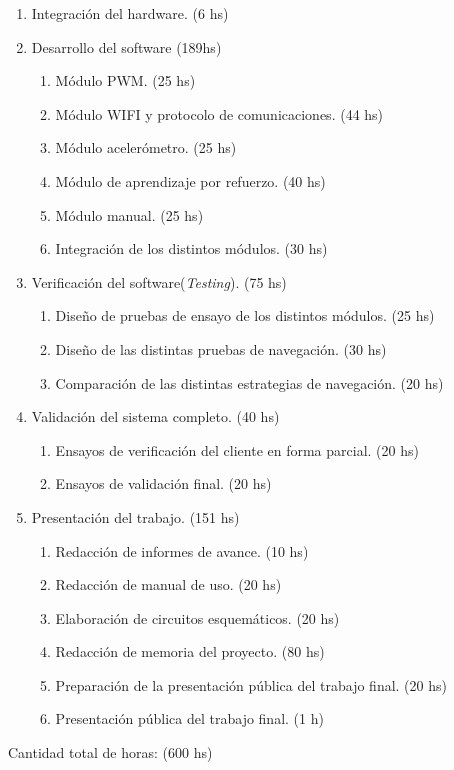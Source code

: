 \documentclass[
11pt, %
codirector, %
]{charter}
\begin{document}
\begin{enumerate}
\vspace{4cm} 

\item Integración del hardware. (6 hs)	
\item Desarrollo del software (189hs)
	\begin{enumerate}
	\item Módulo PWM. (25 hs)
	\item Módulo WIFI y protocolo de comunicaciones. (44 hs)
	\item Módulo acelerómetro.  (25 hs)
	\item Módulo de aprendizaje por refuerzo. (40 hs)
	\item Módulo manual. (25 hs)
	\item Integración de los distintos módulos. (30 hs)
	\end{enumerate}	
\item Verificación del software(\textit{Testing}). (75 hs)
	\begin{enumerate}
	\item Diseño de pruebas  de ensayo de los distintos módulos. (25 hs)
	\item Diseño de las distintas pruebas de navegación. (30 hs)
	\item Comparación de las distintas estrategias de navegación. (20 hs)
	\end{enumerate}	
\item Validación del sistema completo. (40 hs)
	\begin{enumerate}
	\item Ensayos de verificación del cliente en forma parcial. (20 hs)
	\item Ensayos de validación final. (20 hs)
	\end{enumerate}	
\item Presentación del trabajo. (151 hs)
	\begin{enumerate}
	\item Redacción de informes de avance. (10 hs)
	\item Redacción de manual de uso. (20 hs)
	\item Elaboración de circuitos esquemáticos. (20 hs)
	\item Redacción de memoria del proyecto. (80 hs)
	\item Preparación de la presentación pública del trabajo final. (20 hs)
	\item Presentación pública del trabajo final. (1 h)
	\end{enumerate}					
\end{enumerate}
Cantidad total de horas: (600 hs)
\end{document}

